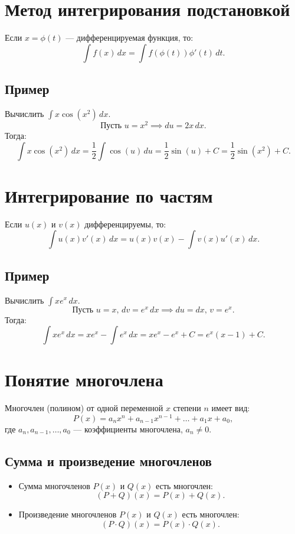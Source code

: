 \documentclass{article}
\begin{document}
\section*{Метод интегрирования подстановкой}
Если \( x = \phi(t) \) — дифференцируемая функция, то:
\[
\int f(x) \, dx = \int f(\phi(t)) \phi'(t) \, dt.
\]
\subsection*{Пример}
Вычислить \( \int x \cos(x^2) \, dx \).
\[
\text{Пусть } u = x^2 \implies du = 2x \, dx.
\]
Тогда:
\[
\int x \cos(x^2) \, dx = \frac{1}{2} \int \cos(u) \, du = \frac{1}{2} \sin(u) + C = \frac{1}{2} \sin(x^2) + C.
\]

\section*{Интегрирование по частям}
Если \( u(x) \) и \( v(x) \) дифференцируемы, то:
\[
\int u(x) v'(x) \, dx = u(x) v(x) - \int v(x) u'(x) \, dx.
\]
\subsection*{Пример}
Вычислить \( \int x e^x \, dx \).
\[
\text{Пусть } u = x, \, dv = e^x \, dx \implies du = dx, \, v = e^x.
\]
Тогда:
\[
\int x e^x \, dx = x e^x - \int e^x \, dx = x e^x - e^x + C = e^x (x - 1) + C.
\]

\section*{Понятие многочлена}
Многочлен (полином) от одной переменной \( x \) степени \( n \) имеет вид:
\[
P(x) = a_n x^n + a_{n-1} x^{n-1} + \dots + a_1 x + a_0,
\]
где \( a_n, a_{n-1}, \dots, a_0 \) — коэффициенты многочлена, \( a_n \neq 0 \).

\subsection*{Сумма и произведение многочленов}
\begin{itemize}
    \item Сумма многочленов \( P(x) \) и \( Q(x) \) есть многочлен:
    \[
    (P + Q)(x) = P(x) + Q(x).
    \]
    \item Произведение многочленов \( P(x) \) и \( Q(x) \) есть многочлен:
    \[
    (P \cdot Q)(x) = P(x) \cdot Q(x).
    \]
\end{itemize}
\end{document}
